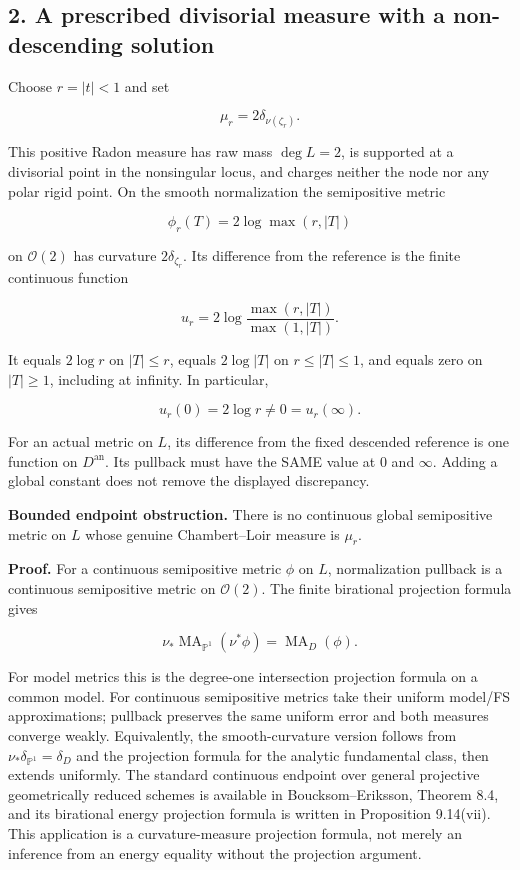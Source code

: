 \documentclass[
  11pt,
]{article}
\begin{document}
\subsection{2. A prescribed divisorial measure with a non-descending
solution}\label{a-prescribed-divisorial-measure-with-a-non-descending-solution}

Choose \(r=|t|<1\) and set

\[
\mu_r=2\delta_{\nu(\zeta_r)}.
\]

This positive Radon measure has raw mass \(\deg L=2\), is supported at a
divisorial point in the nonsingular locus, and charges neither the node
nor any polar rigid point. On the smooth normalization the semipositive
metric

\[
\phi_r(T)=2\log\max(r,|T|)
\]

on \(\mathcal O(2)\) has curvature \(2\delta_{\zeta_r}\). Its difference
from the reference is the finite continuous function

\[
u_r=2\log\frac{\max(r,|T|)}{\max(1,|T|)}.
\]

It equals \(2\log r\) on \(|T|\leq r\), equals \(2\log|T|\) on
\(r\leq|T|\leq1\), and equals zero on \(|T|\geq1\), including at
infinity. In particular,

\[
u_r(0)=2\log r\ne0=u_r(\infty).
\]

For an actual metric on \(L\), its difference from the fixed descended
reference is one function on \(D^{\mathrm{an}}\). Its pullback must have
the SAME value at \(0\) and \(\infty\). Adding a global constant does
not remove the displayed discrepancy.

\textbf{Bounded endpoint obstruction.} There is no continuous global
semipositive metric on \(L\) whose genuine Chambert--Loir measure is
\(\mu_r\).

\textbf{Proof.} For a continuous semipositive metric \(\phi\) on \(L\),
normalization pullback is a continuous semipositive metric on
\(\mathcal O(2)\). The finite birational projection formula gives

\[
\nu_*\operatorname{MA}_{\mathbb P^1}(\nu^*\phi)
=\operatorname{MA}_D(\phi).
\]

For model metrics this is the degree-one intersection projection formula
on a common model. For continuous semipositive metrics take their
uniform model/FS approximations; pullback preserves the same uniform
error and both measures converge weakly. Equivalently, the
smooth-curvature version follows from
\(\nu_*\delta_{\mathbb P^1}=\delta_D\) and the projection formula for
the analytic fundamental class, then extends uniformly. The standard
continuous endpoint over general projective geometrically reduced
schemes is available in Boucksom--Eriksson, Theorem 8.4, and its
birational energy projection formula is written in Proposition
9.14(vii). This application is a curvature-measure projection formula,
not merely an inference from an energy equality without the projection
argument.
\end{document}
